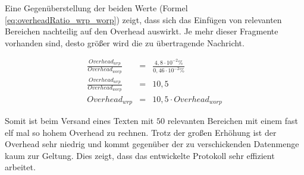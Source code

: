 Eine Gegenüberstellung der beiden Werte (Formel \ref{eq:overheadRatio_wrp_worp})
zeigt, dass sich das Einfügen von relevanten Bereichen nachteilig auf den
Overhead auswirkt. Je mehr dieser Fragmente vorhanden sind, desto größer wird
die zu übertragende Nachricht.

\begin{eqnarray} 
	\frac{ Overhead_{wrp} }{ Overhead_{worp} } & = & \frac{4,8 \cdot 10^{-2} \%}{0,46 \cdot 10^{-2} \%} \\
	\frac{ Overhead_{wrp} }{ Overhead_{worp} } & = & 10,5 \\ 
	Overhead_{wrp} & = & 10,5 \cdot Overhead_{worp}
	\label{eq:overheadRatio_wrp_worp}
\end{eqnarray}

Somit ist beim Versand eines Texten mit $50$ relevanten Bereichen mit einem fast
elf mal so hohem Overhead zu rechnen. Trotz der großen Erhöhung ist der Overhead
sehr niedrig und kommt gegenüber der zu verschickenden Datenmenge kaum zur
Geltung. Dies zeigt, dass das entwickelte Protokoll sehr effizient arbeitet.
